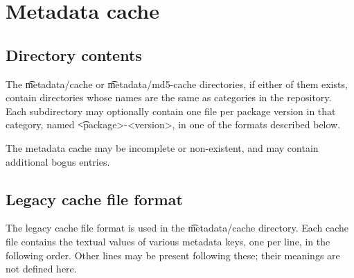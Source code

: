 \chapter{Metadata cache}
\label{ch:metadata-cache}

\section{Directory contents}

The \t{metadata/cache} or \t{metadata/md5-cache} directories, if either of them exists, contain
directories whose names are the same as categories in the repository. Each subdirectory may
optionally contain one file per package version in that category, named \t{<package>-<version>},
in one of the formats described below.

The metadata cache may be incomplete or non-existent, and may contain additional bogus entries.

\section{Legacy cache file format}
\label{sec:legacy-cache}

The legacy cache file format is used in the \t{metadata/cache} directory. Each cache file contains
the textual values of various metadata keys, one per line, in the following order. Other lines may
be present following these; their meanings are not defined here.

